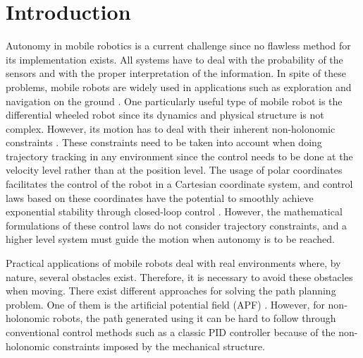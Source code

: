 \documentclass[conference]{IEEEtran}
\begin{document}
\section{Introduction}

Autonomy in mobile robotics is a current challenge since no flawless method for
its implementation exists. All systems have to deal with the probability of the
sensors and with the proper interpretation of the information. In spite of
these problems, mobile robots are widely used in applications such as
exploration and navigation on the ground \cite{Bonin-Font2008}.  One
particularly useful type of mobile robot is the differential wheeled robot
since its dynamics and physical structure is not complex. However, its motion
has to deal with their inherent non-holonomic constraints \cite{Rubayat}.
These constraints need to be taken into account when doing trajectory tracking
in any environment since the control needs to be done at the velocity level
rather than at the position level.
The usage of polar coordinates facilitates the control of the robot in a
Cartesian coordinate system, and control laws based on these coordinates have
the potential to smoothly achieve exponential stability through closed-loop
control \cite{Matoui}. However, the mathematical formulations of these control
laws do not consider trajectory constraints, and a higher level system must
guide the motion when autonomy is to be reached.

Practical applications of mobile robots deal with real environments where, by
nature, several obstacles exist. Therefore, it is necessary to avoid these
obstacles when moving. There exist different approaches for solving the path
planning problem. One of them is the artificial potential field (APF)
\cite{Woods}. However, for non-holonomic robots, the path generated using it
can be hard to follow through conventional control methods such as a classic
PID controller because of the non-holonomic constraints imposed by the
mechanical structure.
\end{document}
